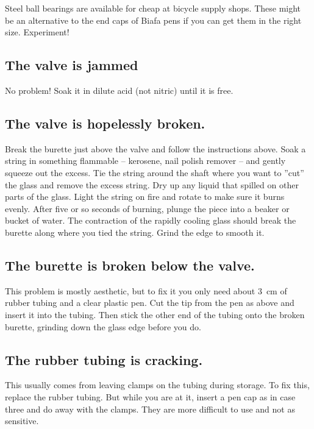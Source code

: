 Steel ball bearings are available for cheap at bicycle supply shops. 
These might be an alternative to the end caps of Biafa pens 
if you can get them in the right size. 
Experiment!

\subsection{The valve is jammed}
No problem! Soak it in dilute acid (not nitric) until it is free.

\subsection{The valve is hopelessly broken.}
Break the burette just above the valve and follow the instructions above. 
Soak a string in something flammable -- kerosene, 
nail polish remover -- and gently squeeze out the excess. 
Tie the string around the shaft where 
you want to ''cut'' the glass and remove the excess string. 
Dry up any liquid that spilled on other parts of the glass. 
Light the string on fire and rotate to make sure it burns evenly. 
After five or so seconds of burning, 
plunge the piece into a beaker or bucket of water. 
The contraction of the rapidly cooling glass 
should break the burette along where you tied the string. 
Grind the edge to smooth it.

\subsection{The burette is broken below the valve.}
This problem is mostly aesthetic, 
but to fix it you only need about 3~cm of rubber tubing 
and a clear plastic pen. 
Cut the tip from the pen as above and insert it into the tubing. 
Then stick the other end of the tubing onto the broken burette, 
grinding down the glass edge before you do.

\subsection{The rubber tubing is cracking.}
This usually comes from leaving clamps on the tubing during storage. 
To fix this, 
replace the rubber tubing. 
But while you are at it, 
insert a pen cap as in case three and do away with the clamps. 
They are more difficult to use and not as sensitive.

